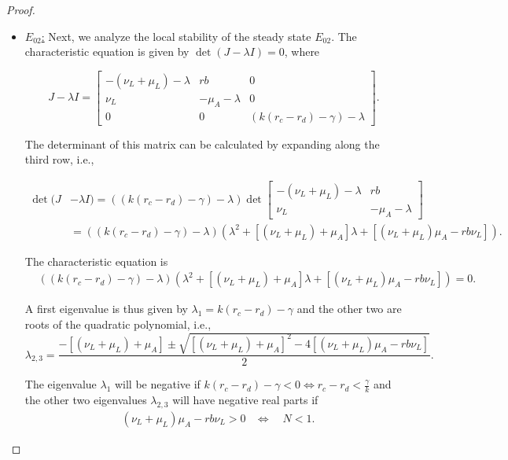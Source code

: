 \documentclass{article}
\theoremstyle{remark}
\theoremstyle{custom} %
\begin{document}
\begin{proof}
\begin{itemize}
 Since $r_c-r_d>\frac{\gamma}{k}$ is also an existence condition for ${\tilde{E}_{01}}$, the analysis confirms that ${\tilde{E}_{01}}$ is LAS, establishing the stability conditions stated in item 1, and becomes unstable when $N>1$.


 \item \underline{$E_{02}$:} Next, we analyze the local stability of the steady state $E_{02}$. The characteristic equation is given by \(\det(J - \lambda I) = 0\), where


$$
J-\lambda I =\left[\begin{array}{ccc}
-\left(\nu_L+\mu_L\right)-\lambda & r b & 0 \\
\nu_L & -\mu_A-\lambda & 0 \\
0 & 0 & (k(r_c - r_d) -\gamma)-\lambda
\end{array}\right]. 
$$

The determinant of this matrix can be calculated by expanding along the third row, i.e., 

$$
\begin{aligned}
\operatorname{det}(J & -\lambda I)=((k(r_c - r_d)-\gamma)-\lambda) \operatorname{det}\left[\begin{array}{cc}
-\left(\nu_L+\mu_L\right)-\lambda & r b \\
\nu_L & -\mu_A-\lambda
\end{array}\right] \\
& =((k(r_c - r_d) -\gamma)-\lambda) \left(\lambda^2+\left[\left(\nu_L+\mu_L\right)+\mu_A\right] \lambda+\left[\left(\nu_L+\mu_L\right) \mu_A-r b \nu_L\right]\right).
\end{aligned}
$$

The characteristic equation is
$
\begin{aligned}
&((k(r_c - r_d)-\gamma)-\lambda) \left(\lambda^2+\left[\left(\nu_L+\mu_L\right)+\mu_A\right] \lambda+\left[\left(\nu_L+\mu_L\right) \mu_A-r b \nu_L\right]\right)=0.
\end{aligned}
$

A first eigenvalue is thus given by $\lambda_1=k(r_c - r_d) -\gamma$
and the other two are roots of the quadratic polynomial, i.e., 
\[
\lambda_{2,3} = \frac{-\left[(\nu_L + \mu_L) + \mu_A\right] \pm \sqrt{\left[(\nu_L + \mu_L) + \mu_A\right]^2 - 4\left[(\nu_L + \mu_L) \mu_A - r b \nu_L\right]}}{2}.
\]

The eigenvalue \(\lambda_1\) will be negative if
$k\left(r_c-r_d\right)-\gamma<0 \Leftrightarrow r_c-r_d<\frac{\gamma}{k}$
and  the other two eigenvalues \(\lambda_{2,3}\) will have negative real parts if $$
\begin{aligned}
& \left(\nu_L+\mu_L\right) \mu_A-r b \nu_L>0 
& \Leftrightarrow\quad {N}<1.
\end{aligned}$$


\end{itemize}
\end{proof}
\end{document}
